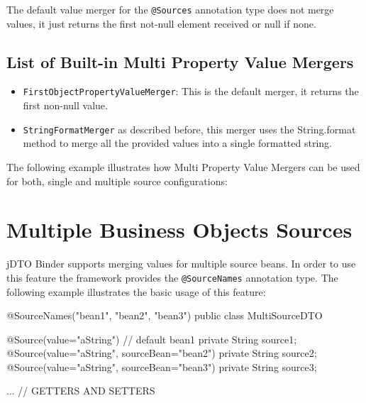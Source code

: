 \documentclass[11pt]{article}
\newcommand{\JDTO}{jDTO Binder\xspace}
\begin{document}
The default value merger for the \texttt{@Sources} annotation type does not merge values, it just returns the first not-null element received or null if none.

\subsection{List of Built-in Multi Property Value Mergers}

\begin{itemize}
 \item \texttt{FirstObjectPropertyValueMerger}: This is the default merger, it returns the first non-null value.
 \item \texttt{StringFormatMerger} as described before, this merger uses the String.format method to merge all the provided values into a single formatted string.
\end{itemize}


The following example illustrates how Multi Property Value Mergers can be used for both, single and multiple source configurations:




\section{Multiple Business Objects Sources}

\JDTO supports merging values for multiple source beans. In order to use this feature the framework provides the \texttt{@SourceNames} annotation type. The following example illustrates the basic usage of this feature:



\begin{java}
@SourceNames({"bean1", "bean2", "bean3"})
public class MultiSourceDTO {
    
    @Source(value="aString") // default bean1
    private String source1;
    @Source(value="aString", sourceBean="bean2")
    private String source2;
    @Source(value="aString", sourceBean="bean3")
    private String source3;
    
    ... // GETTERS AND SETTERS
}
\end{java}
\end{document}
